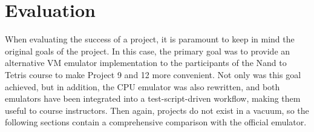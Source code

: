 \section{Evaluation} \label{evaluation}
When evaluating the success of a project, it is paramount to keep in mind the original goals of the project.
In this case, the primary goal was to provide an alternative VM emulator implementation to the participants of the Nand to Tetris course to make Project 9 and 12 more convenient.
Not only was this goal achieved, but in addition, the CPU emulator was also rewritten, and both emulators have been integrated into a test-script-driven workflow, making them useful to course instructors.
Then again, projects do not exist in a vacuum, so the following sections contain a comprehensive comparison with the official emulator.

